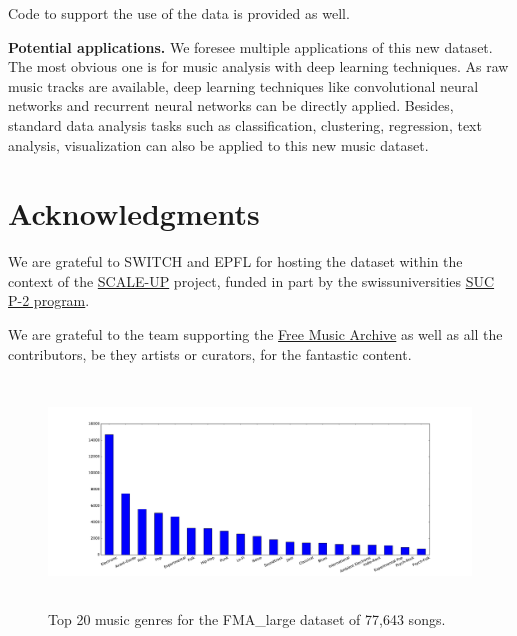 \documentclass{article}
\begin{document}
Code to support the use of the data is provided as well.
 
{\bf Potential applications.}
We foresee multiple applications of this new dataset. The most obvious one is for music analysis with deep learning techniques. As raw music tracks are available, deep learning techniques like convolutional neural networks \cite{mnist} and recurrent neural networks \cite{art:HochreiterSchmidhuber97LSTM} can be directly applied. Besides, standard data analysis tasks such as classification, clustering, regression, text analysis, visualization can also be applied to this new music dataset.

\section{Acknowledgments}

We are grateful to SWITCH and EPFL for hosting the dataset within the context
of the \href{https://projects.switch.ch/scale-up/}{SCALE-UP} project, funded in
part by the swissuniversities \href{http://www.swissuniversities.ch/isci}{SUC
P-2 program}.

We are grateful to the team supporting the \href{https://freemusicarchive.org}{Free Music Archive} as well as all the contributors, be they artists or curators, for the fantastic content.








\begin{figure}[h!]
\centering
\includegraphics[height=6cm]{histo_large.pdf}
\vspace{-0.5cm}
\caption{Top 20 music genres for the FMA\_large dataset of 77,643 songs.}
\label{fig_large}
\end{figure}
\end{document}
